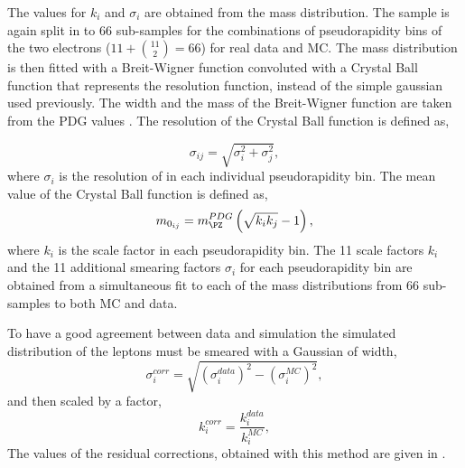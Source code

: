 The values for $k_{i}$ and $\sigma_{i}$ are obtained from the
\HepProcess{\PZ\to\Pe\Pe} mass distribution. The \HepProcess{\PZ\to\Pe\Pe}
sample is again split in to 66 sub-samples for the combinations of
pseudorapidity bins of the two electrons ($11+\binom{11}{2} = 66$) for real data
and {MC}.  The \HepProcess{\PZ\to\Pe\Pe} mass distribution is then fitted with a
Breit-Wigner function convoluted with a Crystal Ball function that represents
the resolution function, instead of the simple gaussian used previously. The
width and the mass of the Breit-Wigner function are taken from the PDG values
\cite{beringer2012review}. The resolution of the Crystal Ball function is
defined as,

\begin{equation}
\sigma_{ij} = \sqrt{\sigma_{i}^{2} + \sigma_{j}^{2}} ,
\end{equation}
where $\sigma_{i}$ is the resolution of in each individual pseudorapidity bin.
The mean value of the Crystal Ball function is defined as,
\begin{equation}
m_{0_{ij}} = m_{\PZ}^{PDG} 
          \left( \sqrt{k_{i} k_{j}} - 1 \right) ,
\end{equation}
where $k_{i}$ is the scale factor in each pseudorapidity bin.  The 11 scale
factors $k_{i}$ and the 11 additional smearing factors $\sigma_{i}$ for each
pseudorapidity bin are obtained from a simultaneous fit to each of the mass
distributions from 66 sub-samples to both {MC} and data. 

To have a good agreement between data and simulation the simulated \pT
distribution of the leptons must be smeared with a Gaussian of width,
\begin{equation}
\sigma^{corr}_{i} = 
\sqrt{
\left(\sigma^{data}_{i}\right)^{2} -
\left(\sigma^{MC}_{i}  \right)^{2} 
},
\end{equation}
and then scaled by a factor,
\begin{equation}
k^{corr}_i = \frac{ k^{data}_i}{k^{MC}_i} ,
\end{equation}
The values of the
residual corrections, obtained with this method are given in
.

